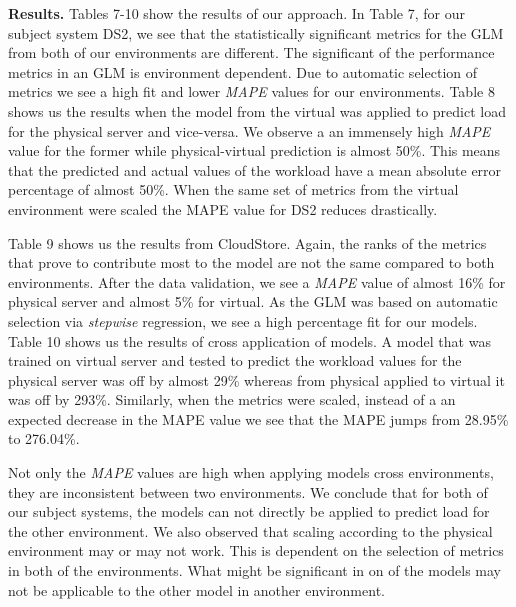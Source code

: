 

 
\textbf{Results.} Tables 7-10 show the results of our approach. In Table 7, for our subject system DS2, we see that the statistically significant metrics for the GLM from both of our environments are different. The significant of the performance metrics in an GLM is environment dependent. Due to automatic selection of metrics we see a high fit and lower \textit{MAPE} values for our environments. Table 8 shows us the results when the model from the virtual was applied to predict load for the physical server and vice-versa. We observe a an immensely high \textit{MAPE} value for the former while physical-virtual prediction is almost 50\%. This means that the predicted and actual values of the workload have a mean absolute error percentage of almost 50\%. When the same set of metrics from the virtual environment were scaled the MAPE value for DS2 reduces drastically.


Table 9 shows us the results from CloudStore. Again, the ranks of the metrics that prove to contribute most to the model are not the same compared to both environments. After the data validation, we see a \textit{MAPE} value of almost 16\% for physical server and almost 5\% for virtual. As the GLM was based on automatic selection via \textit{stepwise} regression, we see a high percentage fit for our models. 
Table 10 shows us the results of cross application of models. A model that was trained on virtual server and tested to predict the workload values for the physical server was off by almost 29\% whereas from physical applied to virtual it was off by 293\%. Similarly, when the metrics were scaled, instead of a an expected decrease in the MAPE value we see that the MAPE jumps from 28.95\% to 276.04\%.

Not only the \textit{MAPE} values are high when applying models cross environments, they are inconsistent between two environments. We conclude that for both of our subject systems, the models can not directly be applied to predict load for the other environment. We also observed that scaling according to the physical environment may or may not work. This is dependent on the selection of metrics in both of the environments. What might be significant in on of the models may not be applicable to the other model in another environment.




